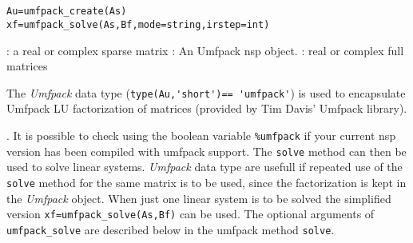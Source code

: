 
\begin{mandesc}
  \\
  \\
\end{mandesc}

\begin{calling_sequence}
\begin{verbatim}
Au=umfpack_create(As)
xf=umfpack_solve(As,Bf,mode=string,irstep=int)
\end{verbatim}
\end{calling_sequence}
\begin{parameters}
  \begin{varlist}
    : a real or complex sparse matrix
    : An Umfpack nsp object.
    : real or complex full matrices 
  \end{varlist}
\end{parameters}

\begin{mandescription}
The \emph{Umfpack} data type (\verb+type(Au,'short')== 'umfpack'+) is used to 
encapsulate Umfpack LU factorization of matrices (provided by Tim Davis' Umfpack library). 
\end{mandescription}. It is possible to check using the boolean variable \verb+%umfpack+ 
if your current nsp version has been compiled with umfpack support. The \verb+solve+ method 
can then be used to solve linear systems. \emph{Umfpack} data type are usefull if 
repeated use of the \verb+solve+ method for the same matrix is to be used, 
since the factorization is kept in the \emph{Umfpack} object. When just one linear 
system is to be solved the simplified version \verb+xf=umfpack_solve(As,Bf)+ can be used. 
The optional arguments of \verb+umfpack_solve+ are described below in the umfpack method
\verb+solve+.


